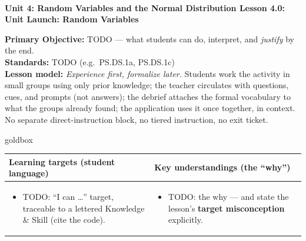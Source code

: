 \documentclass[10pt]{article}
\newcommand{\UnitNumberName}{Unit 4: Random Variables and the Normal Distribution \quad}
\newcommand{\LessonNumberName}{Lesson 4.0: Unit Launch: Random Variables}
\begin{document}
\begin{center}
    {\Large\bfseries \CourseName \\
    {\small\bfseries \UnitNumberName \LessonNumberName}}
\end{center}

\begin{tcolorbox}[colback=frost, colframe=cerulean, boxrule=0.9pt, arc=2mm,
    left=2mm, right=2mm, top=1.5mm, bottom=1.5mm]
    \textbf{Primary Objective:} TODO --- what students can do, interpret, and \emph{justify}
    by the end.
    \\[2pt]
    \textbf{Standards:} TODO (e.g.\ PS.DS.1a, PS.DS.1c)
    \\[2pt]
    \textbf{Lesson model:} \emph{Experience first, formalize later.} Students work the activity
    in small groups using only prior knowledge; the teacher circulates with questions, cues, and
    prompts (not answers); the debrief attaches the formal vocabulary to what the groups already
    found; the application uses it once together, in context. No separate direct-instruction
    block, no tiered instruction, no exit ticket.
\end{tcolorbox}

\renewcommand{\arraystretch}{1.4}
\begin{skillbox}{goldbox}
\begin{tabularx}{\linewidth}{@{}X|X@{}}
\textbf{Learning targets (student language)} & \textbf{Key understandings (the ``why'')} \\[2pt]
\hline
\vspace{-6pt}
\begin{itemize}[leftmargin=1.1em, nosep, after=\vspace{2pt}]
  \item TODO: ``I can \dots'' target, traceable to a lettered Knowledge \& Skill (cite the code).
\end{itemize}
&
\vspace{-6pt}
\begin{itemize}[leftmargin=1.1em, nosep, after=\vspace{2pt}]
  \item TODO: the why --- and state the lesson's \textbf{target misconception} explicitly.
\end{itemize}
\end{tabularx}
\end{skillbox}
\end{document}
